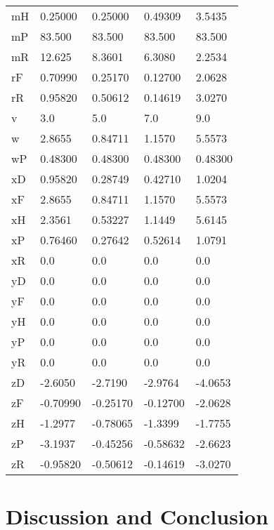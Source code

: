 \documentclass{bmd2019a}
\begin{document}
\begin{table}
\begin{tabular}{lllll}
mH     & 0.25000  & 0.25000 &    0.49309 &   3.5435 \\
mP     & 83.500   & 83.500 &     83.500 &    83.500 \\
mR     & 12.625   & 8.3601 &     6.3080 &    2.2534 \\
rF     & 0.70990  & 0.25170 &    0.12700 &   2.0628 \\
rR     & 0.95820  & 0.50612 &    0.14619 &   3.0270 \\
v      & 3.0      & 5.0 &        7.0 &       9.0 \\
w      & 2.8655   & 0.84711 &    1.1570 &    5.5573 \\
wP     & 0.48300  & 0.48300 &    0.48300 &   0.48300 \\
xD     & 0.95820  & 0.28749 &    0.42710 &   1.0204 \\
xF     & 2.8655   & 0.84711 &    1.1570 &    5.5573 \\
xH     & 2.3561   & 0.53227 &    1.1449 &    5.6145 \\
xP     & 0.76460  & 0.27642 &    0.52614 &   1.0791 \\
xR     & 0.0      & 0.0 &        0.0 &       0.0 \\
yD     & 0.0      & 0.0 &        0.0 &       0.0 \\
yF     & 0.0      & 0.0 &        0.0 &       0.0 \\
yH     & 0.0      & 0.0 &        0.0 &       0.0 \\
yP     & 0.0      & 0.0 &        0.0 &       0.0 \\
yR     & 0.0      & 0.0 &        0.0 &       0.0 \\
zD     & -2.6050  & -2.7190 &    -2.9764 &   -4.0653 \\
zF     & -0.70990 & -0.25170 &   -0.12700 &  -2.0628 \\
zH     & -1.2977  & -0.78065 &   -1.3399 &   -1.7755 \\
zP     & -3.1937  & -0.45256 &   -0.58632 &  -2.6623 \\
zR     & -0.95820 & -0.50612 &   -0.14619 &  -3.0270 \\
    \bottomrule
  \end{tabular}
\end{table}

\section{Discussion and Conclusion}
%



\end{document}
